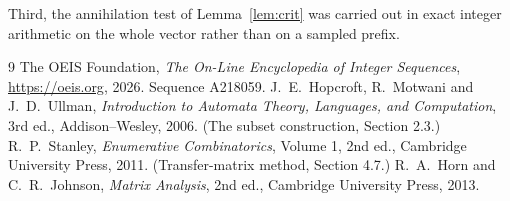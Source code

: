 \documentclass[11pt,a4paper]{article}
\theoremstyle{plain}
\theoremstyle{definition}
\begin{document}
Third, the annihilation test of Lemma~\ref{lem:crit} was carried out in exact integer
arithmetic on the whole vector rather than on a sampled prefix.

\begin{thebibliography}{9}
 The OEIS Foundation, \emph{The On-Line Encyclopedia of Integer
Sequences}, \url{https://oeis.org}, 2026. Sequence A218059.
 J.~E.~Hopcroft, R.~Motwani and J.~D.~Ullman, \emph{Introduction to Automata
Theory, Languages, and Computation}, 3rd ed., Addison--Wesley, 2006. (The subset
construction, Section 2.3.)
 R.~P.~Stanley, \emph{Enumerative Combinatorics}, Volume 1, 2nd ed.,
Cambridge University Press, 2011. (Transfer-matrix method, Section 4.7.)
 R.~A.~Horn and C.~R.~Johnson, \emph{Matrix Analysis}, 2nd ed., Cambridge
University Press, 2013.
\end{thebibliography}
\end{document}
